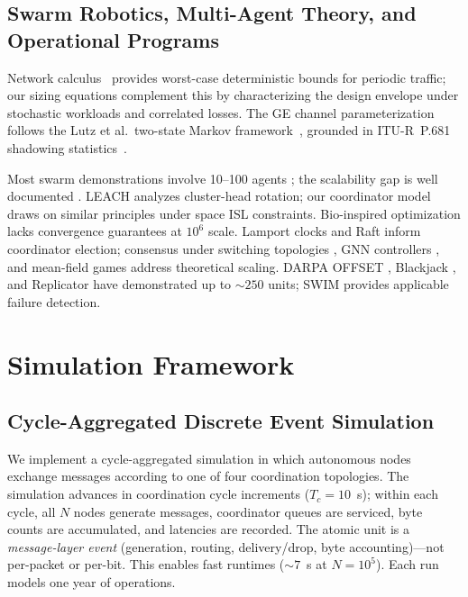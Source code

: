 \documentclass[journal]{IEEEtran}
\begin{document}
\subsection{Swarm Robotics, Multi-Agent Theory, and Operational Programs}

Network calculus~\cite{leboudec_netcalc} provides worst-case deterministic bounds for periodic traffic; our sizing equations complement this by characterizing the design envelope under stochastic workloads and correlated losses. The GE channel parameterization follows the Lutz et al.\ two-state Markov framework~\cite{lutz_1991}, grounded in ITU-R~P.681 shadowing statistics~\cite{itu_p681}.

Most swarm demonstrations involve 10--100 agents \cite{brambilla_2013}; the scalability gap is well documented \cite{dorigo_2021}. LEACH \cite{heinzelman_leach} analyzes cluster-head rotation; our coordinator model draws on similar principles under space ISL constraints. Bio-inspired optimization \cite{dorigo_aco, kennedy_pso, karaboga_abc} lacks convergence guarantees at $10^6$ scale. Lamport clocks \cite{lamport_clocks} and Raft \cite{ongaro_raft} inform coordinator election; consensus under switching topologies \cite{olfati_consensus, ren_beard}, GNN controllers \cite{tolstaya_gnn, li_decentralized}, and mean-field games \cite{lasry_mfg, huang_mfg} address theoretical scaling. DARPA OFFSET \cite{darpa_offset}, Blackjack \cite{darpa_blackjack}, and Replicator \cite{dod_replicator} have demonstrated up to ${\sim}250$ units; SWIM \cite{das_swim} provides applicable failure detection.


\section{Simulation Framework}

\subsection{Cycle-Aggregated Discrete Event Simulation}
\label{sec:des_architecture}

We implement a cycle-aggregated simulation in which autonomous nodes exchange messages according to one of four coordination topologies. The simulation advances in coordination cycle increments ($T_c = 10$~s); within each cycle, all $N$ nodes generate messages, coordinator queues are serviced, byte counts are accumulated, and latencies are recorded. The atomic unit is a \emph{message-layer event} (generation, routing, delivery/drop, byte accounting)---not per-packet or per-bit. This enables fast runtimes (${\sim}7$~s at $N = 10^5$). Each run models one year of operations.
\end{document}
